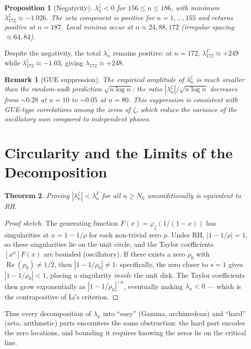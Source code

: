 \documentclass[11pt,a4paper]{article}
\newtheorem{theorem}{Theorem}
\newtheorem{proposition}[theorem]{Proposition}
\newtheorem{remark}{Remark}
\newcommand{\Li}{\lambda}
\newcommand{\LiG}{\lambda^{\Gamma}}
\newcommand{\LiZ}{\lambda^{\zeta}}
\begin{document}
\begin{proposition}[Negativity]\label{prop:neg}
$\LiZ_n < 0$ for $156 \le n \le 186$, with minimum $\LiZ_{172} \approx -1.026$.
The zeta component is positive for $n=1,\ldots,155$ and returns positive at $n=187$.
Local minima occur at $n\approx 24, 88, 172$ (irregular spacing $\approx 64, 84$).
\end{proposition}

Despite the negativity, the total $\Li_n$ remains positive: at $n=172$,
$\LiG_{172} \approx +249$ while $\LiZ_{172} \approx -1.03$, giving
$\Li_{172} \approx +248$.

\begin{remark}[GUE suppression]
The empirical amplitude of $\LiZ_n$ is much smaller than the random-walk
prediction $\sqrt{n\log n}$: the ratio $|\LiZ_n|/\sqrt{n\log n}$ decreases
from $\sim 0.28$ at $n=10$ to $\sim 0.05$ at $n=80$. This suppression is
consistent with GUE-type correlations among the zeros of $\zeta$,
which reduce the variance of the oscillatory sum compared to independent
phases.
\end{remark}

\section{Circularity and the Limits of the Decomposition}

\begin{theorem}\label{thm:circular}
Proving $|\LiZ_n| < \LiG_n$ for all $n\ge N_0$ unconditionally
is equivalent to RH.
\end{theorem}

\begin{proof}[Proof sketch]
The generating function $F(x) = \varphi_\zeta(1/(1-x))$ has singularities at
$x = 1-1/\rho$ for each non-trivial zero $\rho$. Under RH, $|1-1/\rho|=1$,
so these singularities lie on the unit circle, and the Taylor coefficients
$[x^n]F(x)$ are bounded (oscillatory). If there exists a zero $\rho_0$ with
$\operatorname{Re}(\rho_0) \ne 1/2$, then $|1-1/\rho_0| \ne 1$: specifically,
the zero closer to $s=1$ gives $|1-1/\rho_0| < 1$, placing a singularity
\emph{inside} the unit disk. The Taylor coefficients then grow exponentially
as $|1-1/\rho_0|^{-n}$, eventually making $\Li_n < 0$ --- which is the
contrapositive of Li's criterion.
\end{proof}

Thus every decomposition of $\Li_n$ into ``easy'' (Gamma, archimedean) and
``hard'' (zeta, arithmetic) parts encounters the same obstruction: the hard
part encodes the zero locations, and bounding it requires knowing the zeros
lie on the critical line.
\end{document}
